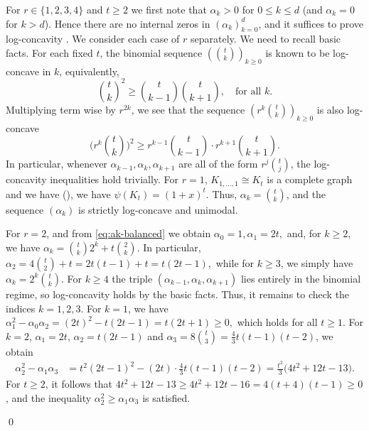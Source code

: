 \documentclass[12pt,twoside]{article}
\renewenvironment{proof}{{\noindent\bfseries Proof.}}{\qed}
\begin{document}
	\begin{proof} For $r\in\{1,2,3,4\}$ and $t\ge 2$ we first note that
		$\alpha_k>0$ for $0\le k\le d$ (and $\alpha_k=0$ for $k>d$). Hence there are no internal
		zeros in $(\alpha_k)_{k=0}^d$, and it suffices to prove log-concavity \cite{stanley}.
		We consider each case of $r$ separately. We need to recall basic facts.  For each fixed $t$, the binomial sequence $\left (\binom{t}{k}\right )_{k\ge 0}$
		is known to be log-concave in $k$, equivalently,
		\[
		\binom{t}{k}^2  \ge  \binom{t}{k-1}\binom{t}{k+1},\quad\text{for all }k.
		\]
		Multiplying term wise by $r^{2k}$, we see that the sequence
		$\left (r^k\binom{t}{k}\right )_{k\ge 0}$ is also log-concave
		\[
		\bigl(r^k\binom{t}{k}\bigr)^2
		 \ge  r^{k-1}\binom{t}{k-1}\cdot r^{k+1}\binom{t}{k+1}.
		\]
		In particular, whenever $\alpha_{k-1},\alpha_k,\alpha_{k+1}$ are all of the form
		$r^j\binom{t}{j}$, the log-concavity inequalities hold trivially.
		For $r=1$,  $K_{1,\dots,1}\cong K_t$ is a complete graph and we have (\cite[Proposition~2.1(i)]{0}), we have $\psi(K_t) = (1+x)^t.$ Thus, $\alpha_k=\binom{t}{k}$, and the sequence $(\alpha_k)$ is strictly log-concave and unimodal.
		
		For $r=2$, and from \eqref{eq:ak-balanced} we obtain $\alpha_0=1, \alpha_1=2t,$ and, for $k\ge 2$, we have $\alpha_k = \binom{t}{k}2^k + t\binom{2}{k}.$ 	In particular, $\alpha_2 = 4\binom{t}{2} + t = 2t(t-1)+t = t(2t-1),$ while for $k\ge 3$, we simply have $\alpha_k = 2^k\binom{t}{k}$. For $k\ge 4$ the triple $(\alpha_{k-1},\alpha_k,\alpha_{k+1})$ lies entirely in the
		binomial regime, so log-concavity holds by the basic facts. Thus, it
		remains to check the indices $k=1,2,3$. For $k=1$, we have $\alpha_1^2 - \alpha_0\alpha_2 = (2t)^2 - t(2t-1) = t(2t+1)  \ge  0,$
		which holds for all $t\ge 1$. For $k=2$,  $\alpha_1=2t$, $\alpha_2=t(2t-1)$ and
		$\alpha_3 = 8\binom{t}{3} = \tfrac{4}{3}t(t-1)(t-2)$, we obtain
		\begin{align*}
			\alpha_2^2 - \alpha_1\alpha_3
			&= t^2(2t-1)^2 - (2t)\cdot \frac{4}{3}t(t-1)(t-2)= \frac{t^2}{3}\bigl(4t^2 + 12t - 13\bigr).
		\end{align*}
		For \( t \ge 2 \), it follows that \( 4t^2 + 12t - 13 \ge 4t^2 + 12t - 16 = 4(t+4)(t-1) \ge 0 \), and the inequality \( \alpha_2^2 \ge \alpha_1\alpha_3 \) is satisfied.
		

\end{proof}
\end{document}
